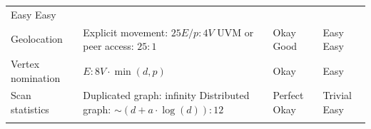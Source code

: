\documentclass[10pt,oneside]{memoir}
\begin{document}
\begin{longtable}[]{@{}llll@{}}
\begin{minipage}[t]{0.19\columnwidth}
Easy \linebreak Easy\strut
\end{minipage}\tabularnewline
\begin{minipage}[t]{0.23\columnwidth}\raggedright
Geolocation\strut
\end{minipage} & \begin{minipage}[t]{0.35\columnwidth}\raggedright
Explicit movement: \(25E/p : 4V\) \linebreak UVM or peer access:
\(25 : 1\)\strut
\end{minipage} & \begin{minipage}[t]{0.11\columnwidth}\raggedright
Okay \linebreak Good\strut
\end{minipage} & \begin{minipage}[t]{0.19\columnwidth}\raggedright
Easy \linebreak Easy\strut
\end{minipage}\tabularnewline
\begin{minipage}[t]{0.23\columnwidth}\raggedright
Vertex nomination\strut
\end{minipage} & \begin{minipage}[t]{0.35\columnwidth}\raggedright
\(E : 8V \cdot \min(d, p)\)\strut
\end{minipage} & \begin{minipage}[t]{0.11\columnwidth}\raggedright
Okay\strut
\end{minipage} & \begin{minipage}[t]{0.19\columnwidth}\raggedright
Easy\strut
\end{minipage}\tabularnewline
\begin{minipage}[t]{0.23\columnwidth}\raggedright
Scan statistics\strut
\end{minipage} & \begin{minipage}[t]{0.35\columnwidth}\raggedright
Duplicated graph: infinity \linebreak Distributed graph:
\(\sim(d+a \cdot \log(d)):12\)\strut
\end{minipage} & \begin{minipage}[t]{0.11\columnwidth}\raggedright
Perfect \linebreak Okay\strut
\end{minipage} & \begin{minipage}[t]{0.19\columnwidth}\raggedright
Trivial \linebreak Easy\strut
\end{minipage}\tabularnewline
\begin{minipage}[t]{0.23\columnwidth}\raggedright

\end{minipage}
\end{longtable}
\end{document}
